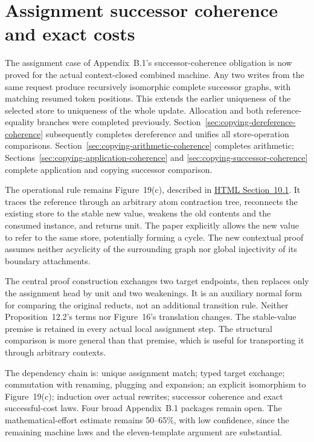 \clearpage
\section{Assignment successor coherence and exact costs}
\label{sec:copying-assignment-coherence}
The assignment case of Appendix~B.1's successor-coherence obligation is now
proved for the actual context-closed combined machine. Any two writes from
the same request produce recursively isomorphic complete successor graphs,
with matching resumed token positions. This extends the earlier uniqueness
of the selected store to uniqueness of the whole update. Allocation and both
reference-equality branches were completed previously.
Section~\ref{sec:copying-dereference-coherence} subsequently completes
dereference and unifies all store-operation comparisons.
Section~\ref{sec:copying-arithmetic-coherence} completes arithmetic;
Sections~\ref{sec:copying-application-coherence} and \ref{sec:copying-successor-coherence} complete application and copying successor comparison.

The operational rule remains Figure~19(c), described in
\href{https://arxiv.org/html/1907.01257v5\#S10.SS1}{HTML Section~10.1}.
It traces the reference through an arbitrary atom contraction tree, reconnects
the existing store to the stable new value, weakens the old contents and the
consumed instance, and returns unit. The paper explicitly allows the new value
to refer to the same store, potentially forming a cycle. The new contextual
proof assumes neither acyclicity of the surrounding graph nor global injectivity
of its boundary attachments.

The central proof construction exchanges two target endpoints, then replaces
only the assignment head by unit and two weakenings. It is an auxiliary normal
form for comparing the original reducts, not an additional transition rule.
Neither Proposition~12.2's terms nor Figure~16's translation changes. The
stable-value premise is retained in every actual local assignment step.
The structural comparison is more general than that premise, which is useful
for transporting it through arbitrary contexts.

The dependency chain is: unique assignment match; typed target exchange;
commutation with renaming, plugging and expansion; an explicit isomorphism to
Figure~19(c); induction over actual rewrites; successor coherence and exact
successful-cost laws. Four broad Appendix~B.1 packages remain open. The
mathematical-effort estimate remains 50--65\%, with low confidence, since the
remaining machine laws and the eleven-template argument are substantial.

